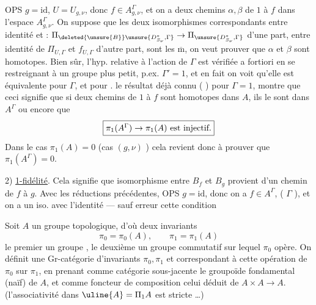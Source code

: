 OPS \(g=\mathrm{id}\), \(U=U_{g,\nu}\), donc \(f\in A_{g,\nu}^{\Gamma}\), et on a deux chemins \(\alpha,\beta\) de \(1\) à  \(f\) dans l'espace \(A_{g,\nu}^{\Gamma}\). On suppose que les deux isomorphismes correspondants entre identité  et  : \(\Pi_{\deleted{\unsure{B}}\unsure{D^*_{S_\nu},\Gamma}}\to\Pi_{\unsure{D^*_{S_\nu},\Gamma}}\) d'une part, entre identité de \(\Pi_{U,\Gamma}\) et \(f_{U,\Gamma}\) d'autre part, sont les \(\overline{\mathrm m}\), on veut prouver que \(\alpha\) et \(\beta\) sont homotopes. Bien sûr, l'hyp.  relative à l'action de \(\Gamma\) est vérifiée a fortiori en se restreignant à un groupe plus petit, p.ex. \deleted{\unsure{\(\Gamma\)}} \(\Gamma'=1\), et en fait on voit qu'elle est équivalente pour \(\Gamma\), et pour .  le résultat déjà connu ( ) pour \(\Gamma=1\), montre que ceci signifie que si deux chemins  de \(1\) à \(f\) sont homotopes dans \(A\), ils le sont dans \(A^{\Gamma}\) ou encore que
\[
\fbox{\(\pi_1(A^{\Gamma})\to\pi_1(A)\ \mbox{est injectif.}\)}
\]
Dans le cas \(\pi_1(A)=0\) (cas \((g,\nu)\) ) cela revient donc à prouver que \(\pi_1(A^{\Gamma})=0\).



2) \uline{1-fidélité}. Cela signifie  que \unsure{\(\forall\)} isomorphisme entre  \(B_f\) et \(B_g\) provient d'un  chemin de \(f\) à \(g\). Avec les réductions précédentes, OPS \(g=\mathrm{id}\), donc on a \(f\in A^{\Gamma}\),   (  \(\Gamma\) ), et on a un iso. avec l'identité --- sauf erreur cette condition



Soit \(A\) un groupe topologique, d'où deux invariants
\[
\pi_0=\pi_0(A),\qquad \pi_1=\pi_1(A)
\]
le premier un groupe ,  le deuxième un groupe commutatif sur lequel \(\pi_0\) opère. On définit une Gr-catégorie  d'invariants \(\pi_0,\pi_1\) et correspondant à cette opération de \(\pi_0\) sur \(\pi_1\), en prenant comme catégorie sous-jacente le  groupoïde  fondamental (naïf) de \(A\), et comme foncteur de composition celui déduit de \(A\times A\to A\). (l'associativité dans \(\uline{A}=\Pi_1 A\) est stricte \ldots)


